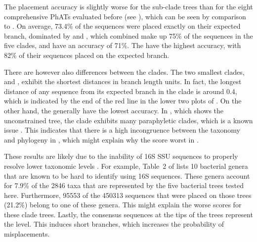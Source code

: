 The placement accuracy is slightly worse for the sub-clade trees
than for the eight comprehensive \acp{PhAT} evaluated before
(see ),
which can be seen by comparison to .
On average, 73.4\% of the sequences were placed exactly on their expected branch,
dominated by  and ,
which combined make up 75\% of the sequences in the five clades, and have an accuracy of 71\%.
The  have the highest accuracy,
with 82\% of their sequences placed on the expected branch.

There are however also differences between the clades.
The two smallest clades,  and ,
exhibit the shortest distances in branch length units.
In fact, the longest distance of any sequence from its expected branch in the  clade
is around \num{0.4}, which is indicated by the end of the red line in the lower two plots of .
On the other hand, the  generally have the lowest accuracy.
In , which shows the unconstrained  tree,
the  clade exhibits many paraphyletic clades,
which is a known issue \cite{Parks2018}.
This indicates that there is a high incongruence
between the  taxonomy and phylogeny in ,
which might explain why the  score worst in .

These results are likely due to the inability of 16S SSU sequences to properly resolve lower taxonomic levels
\cite{Mignard2006,Petti2007,Janda2007}.
For example, Table~2 of \cite{Janda2007} lists \num{10} bacterial genera
that are known to be hard to identify using 16S sequences.
These genera account for \num{7.9}\% of the \num{2846} taxa
that are represented by the five bacterial trees tested here.
Furthermore, \num{95 553} of the \num{450 313} sequences that were placed on those trees (\num{21.2}\%)
belong to one of these genera.
This might explain the worse scores for these clade trees.
Lastly, the consensus sequences at the tips of the trees represent the  level.
This induces short branches, which increases the probability of misplacements.


